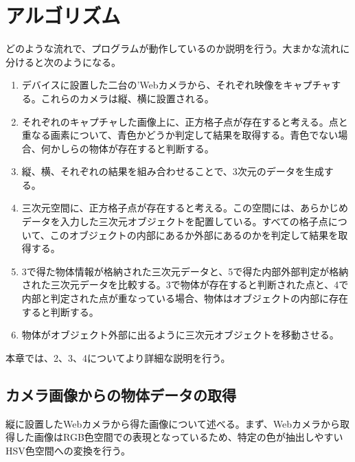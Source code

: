 \section{アルゴリズム}
どのような流れで、プログラムが動作しているのか説明を行う。大まかな流れに分けると次のようになる。

\begin{enumerate}
 \item デバイスに設置した二台の'Webカメラから、それぞれ映像をキャプチャする。これらのカメラは縦、横に設置される。
 \item それぞれのキャプチャした画像上に、正方格子点が存在すると考える。点と重なる画素について、青色かどうか判定して結果を取得する。青色でない場合、何かしらの物体が存在すると判断する。
 \item 縦、横、それぞれの結果を組み合わせることで、3次元のデータを生成する。
 \item 三次元空間に、正方格子点が存在すると考える。この空間には、あらかじめデータを入力した三次元オブジェクトを配置している。すべての格子点について、このオブジェクトの内部にあるか外部にあるのかを判定して結果を取得する。
 \item 3で得た物体情報が格納された三次元データと、5で得た内部外部判定が格納された三次元データを比較する。3で物体が存在すると判断された点と、4で内部と判定された点が重なっている場合、物体はオブジェクトの内部に存在すると判断する。
 \item 物体がオブジェクト外部に出るように三次元オブジェクトを移動させる。
\end{enumerate}
 
本章では、2、3、4についてより詳細な説明を行う。

\subsection{カメラ画像からの物体データの取得}
縦に設置したWebカメラから得た画像について述べる。まず、Webカメラから取得した画像はRGB色空間での表現となっているため、特定の色が抽出しやすいHSV色空間への変換を行う。

